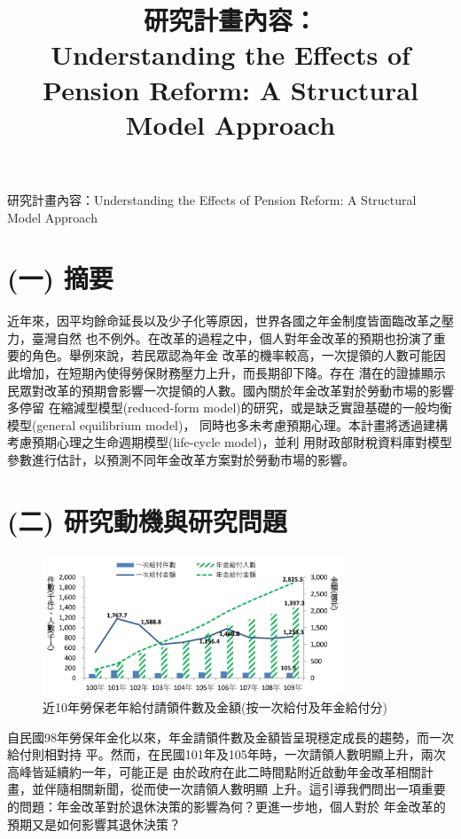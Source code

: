 \documentclass[12pt]{article}
\title{研究計畫內容：\\
Understanding the Effects of Pension Reform: A Structural Model Approach}
\date{}
\begin{document}
\begin{CJK*}{UTF8}{bkai}
\begin{center}
\Large
研究計畫內容：Understanding the Effects of Pension Reform: A Structural Model Approach
\end{center}

\section*{\normalfont(一) 摘要}
近年來，因平均餘命延長以及少子化等原因，世界各國之年金制度皆面臨改革之壓力，臺灣自然
也不例外。在改革的過程之中，個人對年金改革的預期也扮演了重要的角色。舉例來說，若民眾認為年金
改革的機率較高，一次提領的人數可能因此增加，在短期內使得勞保財務壓力上升，而長期卻下降。存在
潛在的證據顯示民眾對改革的預期會影響一次提領的人數。國內關於年金改革對於勞動市場的影響多停留
在縮減型模型(reduced-form model)的研究，或是缺乏實證基礎的一般均衡模型(general equilibrium model)，
同時也多未考慮預期心理。本計畫將透過建構考慮預期心理之生命週期模型(life-cycle model)，並利
用財政部財稅資料庫對模型參數進行估計，以預測不同年金改革方案對於勞動市場的影響。
\section*{\normalfont(二) 研究動機與研究問題}
\begin{figure}[htbp]
    \centering
    \includegraphics[width=0.8\textwidth]{tw_pension_pay.png}
    \caption{近10年勞保老年給付請領件數及金額(按一次給付及年金給付分)\protect\footnotemark}
\end{figure}
自民國98年勞保年金化以來，年金請領件數及金額皆呈現穩定成長的趨勢，而一次給付則相對持
平。然而，在民國101年及105年時，一次請領人數明顯上升，兩次高峰皆延續約一年，可能正是
由於政府在此二時間點附近啟動年金改革相關計畫，並伴隨相關新聞，從而使一次請領人數明顯
上升。這引導我們問出一項重要的問題：年金改革對於退休決策的影響為何？更進一步地，個人對於
年金改革的預期又是如何影響其退休決策？


\end{CJK*}
\end{document}
